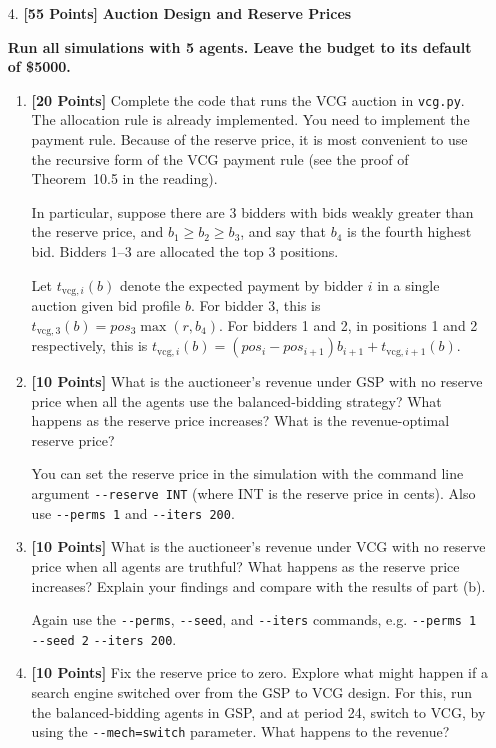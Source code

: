\documentclass[11pt]{article}
\newcommand{\points}[1]{\textbf{[#1 Points]}}
\begin{document}
\begin{enumerate}
		\item[4.] \points{55} {\bf Auction Design and Reserve Prices}

{\bf Run all simulations with 5 agents. Leave the budget to its default
of \$5000.}

			\begin{enumerate}
\item \points{20} Complete the code that runs
the VCG auction in \verb+vcg.py+. The
allocation rule is already implemented. You need to implement the
payment rule. Because of the reserve price, it is most convenient to
use the recursive form 
of the VCG payment rule (see the proof of Theorem~10.5 in the 
reading).

In particular, suppose there are 3 bidders with bids weakly greater
than the reserve price, and $b_1\geq b_2\geq b_3$, and say that $b_4$
is the fourth highest bid. Bidders 1--3 are allocated the top 3
positions. 

Let $t_{\mathrm{vcg},i}(b)$ denote the expected payment by bidder $i$
in a single auction given bid profile $b$.  For bidder 3, this is
$t_{\mathrm{vcg},3}(b)=pos_3 \max(r,b_{4})$. For bidders 1 and 2, in
positions 1 and 2 respectively, this is
$t_{\mathrm{vcg},i}(b)=(pos_i-pos_{i+1})b_{i+1} +t_{\mathrm{vcg},i+1}(b)$.

				\item \points{10} What is the auctioneer's revenue under GSP with no reserve price when all the agents use the balanced-bidding strategy? What happens as the reserve price increases? What is the revenue-optimal reserve price? 

You can set the reserve price in the simulation with the command line argument \verb+--reserve INT+ (where INT is the reserve price in cents). Also use \verb+--perms 1+ and \verb+--iters 200+.
	

				
\item \points{10} What is the auctioneer's revenue under VCG with no
reserve price when all agents are truthful? What happens as the
reserve price increases? Explain your findings and compare with the
results of part (b).

				Again use the \verb+--perms+, \verb+--seed+, and \verb+--iters+ commands, e.g. \verb+--perms 1 --seed 2+ \verb+--iters 200+.
				
				
\item \points{10} Fix the reserve price to zero. 
Explore what might happen if a search engine
switched over from the GSP to VCG design.
For this, 
run the balanced-bidding agents in 
GSP, and at period 24, switch to VCG, by using the \verb+--mech=switch+ parameter. What happens to the revenue?
%


\end{enumerate}
\end{enumerate}
\end{document}
